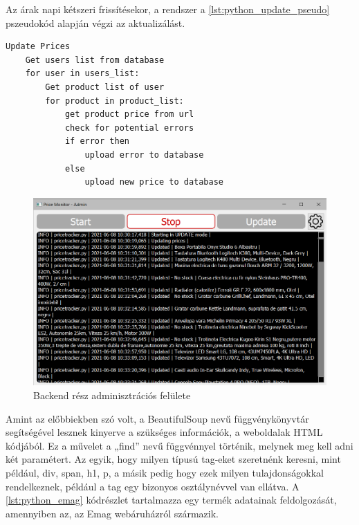 Az árak napi kétszeri frissítésekor, a rendszer a \ref{lst:python_update_pseudo} pszeudokód alapján végzi az aktualizálást.

\begin{lstlisting}[caption={Termékek árának frissitesét leiró pszeudokód}, label={lst:python_update_pseudo}, basicstyle=\footnotesize]
Update Prices
    Get users list from database
    for user in users_list:
        Get product list of user
        for product in product_list:
            get product price from url
            check for potential errors
            if error then 
                upload error to database
            else
                upload new price to database
\end{lstlisting}

\begin{figure}[H]
    \centering
    \includegraphics[scale=0.8]{figures/images/python_ui.png}
    \caption{Backend rész adminisztrációs felülete}
    \label{fig:python_ui}
\end{figure}



Amint az előbbiekben szó volt, a BeautifulSoup nevű függvénykönyvtár segítségével lesznek kinyerve a szükséges információk, a weboldalak HTML kódjából. Ez a művelet a „find” nevű függvénnyel történik, melynek meg kell adni két paramétert. Az egyik, hogy milyen típusú tag-eket szeretnénk keresni, mint például, div, span, h1, p, a másik pedig hogy ezek milyen tulajdonságokkal rendelkeznek, például a tag egy bizonyos osztálynévvel van ellátva. A \ref{lst:python_emag} kódrészlet tartalmazza egy termék adatainak feldolgozását, amennyiben az, az Emag webáruházról származik. 

